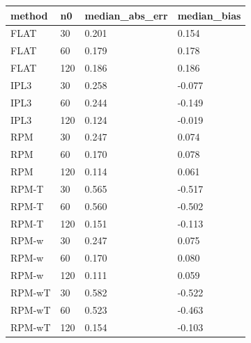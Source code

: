 \begin{tabular}{llll}
\hline
method & n0 & median\_abs\_err & median\_bias \\
\hline
FLAT & 30 & 0.201 & 0.154 \\
FLAT & 60 & 0.179 & 0.178 \\
FLAT & 120 & 0.186 & 0.186 \\
IPL3 & 30 & 0.258 & -0.077 \\
IPL3 & 60 & 0.244 & -0.149 \\
IPL3 & 120 & 0.124 & -0.019 \\
RPM & 30 & 0.247 & 0.074 \\
RPM & 60 & 0.170 & 0.078 \\
RPM & 120 & 0.114 & 0.061 \\
RPM-T & 30 & 0.565 & -0.517 \\
RPM-T & 60 & 0.560 & -0.502 \\
RPM-T & 120 & 0.151 & -0.113 \\
RPM-w & 30 & 0.247 & 0.075 \\
RPM-w & 60 & 0.170 & 0.080 \\
RPM-w & 120 & 0.111 & 0.059 \\
RPM-wT & 30 & 0.582 & -0.522 \\
RPM-wT & 60 & 0.523 & -0.463 \\
RPM-wT & 120 & 0.154 & -0.103 \\
\hline
\end{tabular}
